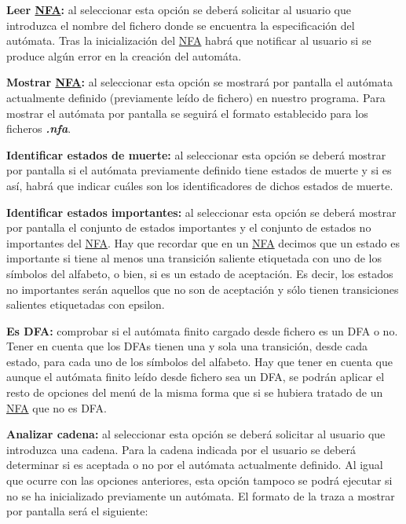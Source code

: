 \begin{DoxyItemize}
\item {\bfseries Leer \mbox{\hyperlink{class_n_f_a}{N\+FA}}\+:} al seleccionar esta opción se deberá solicitar al usuario que introduzca el nombre del fichero donde se encuentra la especificación del autómata. Tras la inicialización del \mbox{\hyperlink{class_n_f_a}{N\+FA}} habrá que notificar al usuario si se produce algún error en la creación del automáta.
\item {\bfseries Mostrar \mbox{\hyperlink{class_n_f_a}{N\+FA}}\+:} al seleccionar esta opción se mostrará por pantalla el autómata actualmente definido (previamente leído de fichero) en nuestro programa. Para mostrar el autómata por pantalla se seguirá el formato establecido para los ficheros {\itshape {\bfseries .nfa}}.
\item {\bfseries Identificar estados de muerte\+:} al seleccionar esta opción se deberá mostrar por pantalla si el autómata previamente definido tiene estados de muerte y si es así, habrá que indicar cuáles son los identificadores de dichos estados de muerte.
\item {\bfseries Identificar estados importantes\+:} al seleccionar esta opción se deberá mostrar por pantalla el conjunto de estados importantes y el conjunto de estados no importantes del \mbox{\hyperlink{class_n_f_a}{N\+FA}}. Hay que recordar que en un \mbox{\hyperlink{class_n_f_a}{N\+FA}} decimos que un estado es importante si tiene al menos una transición saliente etiquetada con uno de los símbolos del alfabeto, o bien, si es un estado de aceptación. Es decir, los estados no importantes serán aquellos que no son de aceptación y sólo tienen transiciones salientes etiquetadas con epsilon.
\item {\bfseries Es D\+FA\+:} comprobar si el autómata finito cargado desde fichero es un D\+FA o no. Tener en cuenta que los D\+F\+As tienen una y sola una transición, desde cada estado, para cada uno de los símbolos del alfabeto. Hay que tener en cuenta que aunque el autómata finito leído desde fichero sea un D\+FA, se podrán aplicar el resto de opciones del menú de la misma forma que si se hubiera tratado de un \mbox{\hyperlink{class_n_f_a}{N\+FA}} que no es D\+FA.
\item {\bfseries Analizar cadena\+:} al seleccionar esta opción se deberá solicitar al usuario que introduzca una cadena. Para la cadena indicada por el usuario se deberá determinar si es aceptada o no por el autómata actualmente definido. Al igual que ocurre con las opciones anteriores, esta opción tampoco se podrá ejecutar si no se ha inicializado previamente un autómata. El formato de la traza a mostrar por pantalla será el siguiente\+:
\end{DoxyItemize}


